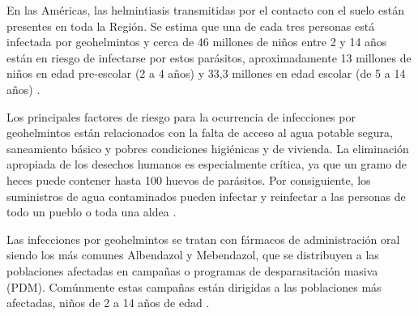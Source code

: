 \documentclass[12pt,a4paper]{article}
\theoremstyle{plain}%
\theoremstyle{definition}
\theoremstyle{remark}
\begin{document}
{	En las Américas, las helmintiasis transmitidas por el contacto con el suelo están presentes en toda la Región.
	Se estima que una de cada tres personas está infectada por geohelmintos y cerca de 46 millones de niños entre 2 y 14 años están en riesgo de infectarse por estos parásitos, aproximadamente 13 millones de niños en edad pre-escolar (2 a 4 años) y 33,3 millones en edad escolar (de 5 a 14 años) \cite{paho2003,who2006preventive,who2012soil}.
	
	Los principales factores de riesgo para la ocurrencia de infecciones por geohelmintos están relacionados con la falta de acceso al agua potable segura,  saneamiento básico y pobres condiciones higiénicas y de vivienda.  La eliminación apropiada de los desechos humanos es especialmente crítica, ya que un gramo de heces puede contener hasta 100 huevos de parásitos. Por consiguiente, los suministros de agua contaminados pueden infectar y reinfectar a las personas de todo un pueblo o toda una aldea \cite{paho2003,who2006preventive,who2012soil}.
	




Las infecciones por geohelmintos se tratan con fármacos de administración oral siendo los más comunes Albendazol y Mebendazol,
   que se distribuyen a las poblaciones afectadas en campañas o programas de desparasitación masiva (PDM). Comúnmente estas campañas están dirigidas a las poblaciones más afectadas,  niños de 2 a 14 años de edad \citep{pizzi2007geohelmintiosis}. 

}
\end{document}
